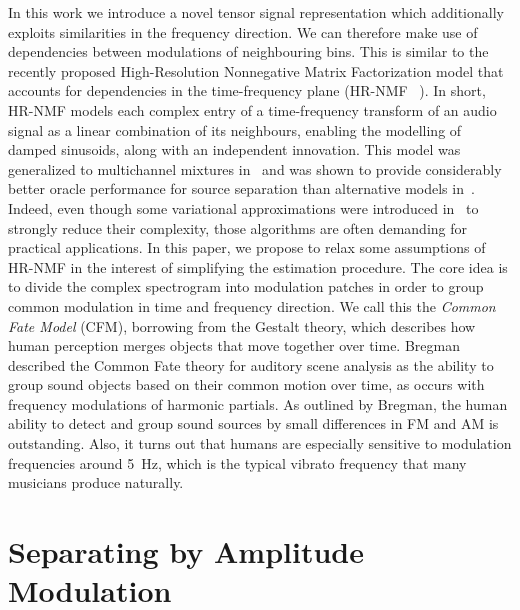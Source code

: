 In this work we introduce a novel tensor signal representation which additionally exploits similarities in the frequency direction. We can therefore make use of dependencies between modulations of neighbouring bins. This is similar to the recently proposed High-Resolution Nonnegative Matrix Factorization
model that accounts for dependencies in the time-frequency plane (HR-NMF
~\cite{badeau11}). In short, HR-NMF models each complex entry of a time-frequency transform of an audio signal as a linear combination of its neighbours, enabling the modelling of damped sinusoids, along with an independent
innovation. This model was generalized to multichannel mixtures in~\cite{badeau13a,badeau14}
and was shown to provide considerably better oracle performance for source separation than alternative models in~\cite{magron15a}.
Indeed, even though some variational approximations were introduced
in~\cite{badeau13} to strongly reduce their complexity,
those algorithms are often demanding for practical applications.
In this paper, we propose to relax some assumptions of HR-NMF in the interest of simplifying the estimation procedure. The core idea is to divide the complex spectrogram into modulation patches in order to group common modulation in time and frequency direction. We call this the \emph{Common Fate Model} (CFM), borrowing from the Gestalt theory, which describes how human perception merges objects that move together over time. Bregman~\cite{bregman94} described the Common Fate theory for auditory scene analysis as the ability to group sound objects based on their common motion over time, as occurs with frequency modulations of harmonic partials. As outlined by Bregman, the human ability to detect and group sound sources by small differences in FM and AM is outstanding. Also, it turns out that humans are especially sensitive to modulation frequencies around 5~Hz, which is the typical vibrato frequency that many musicians produce naturally.

\section{Separating by Amplitude Modulation}
\label{sub:am}

